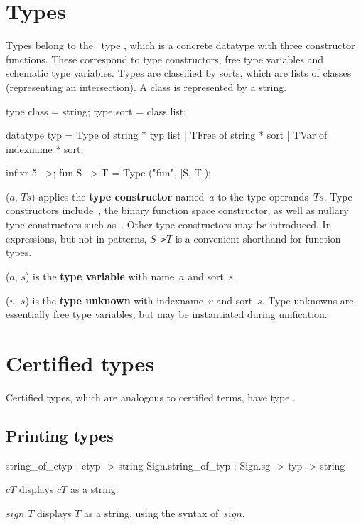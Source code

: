 \section{Types}
Types belong to the \ML\ type , which is a concrete datatype with
three constructor functions.  These correspond to type constructors, free
type variables and schematic type variables.  Types are classified by sorts,
which are lists of classes (representing an intersection).  A class is
represented by a string.
\begin{ttbox}
type class = string;
type sort  = class list;

datatype typ = Type  of string * typ list
             | TFree of string * sort
             | TVar  of indexname * sort;

infixr 5 -->;
fun S --> T = Type ("fun", [S, T]);
\end{ttbox}
\begin{ttdescription}
\item[\ttindexbold{Type}($a$, $Ts$)] 
  applies the {\bf type constructor} named~$a$ to the type operands~$Ts$.
  Type constructors include~, the binary function space
  constructor, as well as nullary type constructors such as~.
  Other type constructors may be introduced.  In expressions, but not in
  patterns, \hbox{\tt$S$-->$T$} is a convenient shorthand for function
  types.

\item[\ttindexbold{TFree}($a$, $s$)] 
  is the {\bf type variable} with name~$a$ and sort~$s$.

\item[\ttindexbold{TVar}($v$, $s$)] 
  is the {\bf type unknown} with indexname~$v$ and sort~$s$.
  Type unknowns are essentially free type variables, but may be
  instantiated during unification.
\end{ttdescription}


\section{Certified types}
Certified types, which are analogous to certified terms, have type
.

\subsection{Printing types}
\begin{ttbox}
     string_of_ctyp :           ctyp -> string
Sign.string_of_typ  : Sign.sg -> typ -> string
\end{ttbox}
\begin{ttdescription}
\item[\ttindexbold{string_of_ctyp} $cT$]
displays $cT$ as a string.

\item[\ttindexbold{Sign.string_of_typ} $sign$ $T$]
displays $T$ as a string, using the syntax of~$sign$.
\end{ttdescription}


